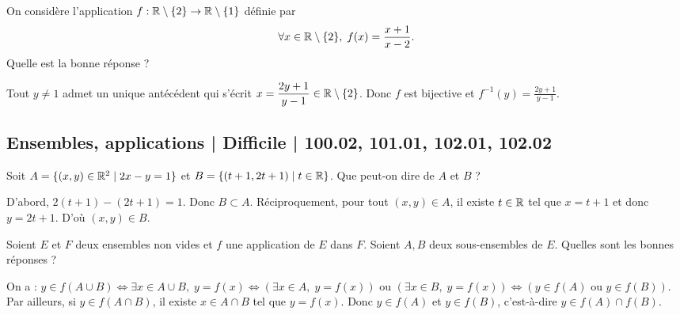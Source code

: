 \begin{question}
On considère l'application $f:\mathbb{R}\setminus\{2\}\to \mathbb{R}\setminus \{1\}$ définie par
$$\forall x\in \mathbb{R}\setminus\{2\},\; f(x)=\frac{x+1}{x-2}.$$
Quelle est la bonne réponse ?
\begin{answers}  
\end{answers}
\begin{explanations}
Tout $y\neq 1$ admet un unique antécédent qui s'écrit $\displaystyle x=\frac{2y+1}{y-1}\in \mathbb{R}\setminus\{2\}$. Donc $f$ est bijective et $\displaystyle f^{-1}(y)=\frac{2y+1}{y-1}$.
\end{explanations}
\end{question}

\subsection{Ensembles, applications | Difficile | 100.02, 101.01, 102.01, 102.02}


\begin{question}
Soit $A=\{(x,y)\in \mathbb{R}^2\mid 2x-y=1\}$ et $B=\{(t+1,2t+1)\mid t\in \mathbb{R}\}$. Que peut-on dire de $A$ et $B$ ?
\begin{answers}  
\end{answers}
\begin{explanations}
D'abord, $2(t+1)-(2t+1)=1$. Donc $B\subset A$. Réciproquement, pour tout $(x,y)\in A$, il existe $t\in \mathbb{R}$ tel que $x=t+1$ et donc $y=2t+1$. D'où $(x,y)\in B$.
\end{explanations}
\end{question}

\begin{question}
Soient $E$ et $F$ deux ensembles non vides et $f$ une application de $E$ dans $F$. Soient $A,B$ deux sous-ensembles de $E$. Quelles sont les bonnes réponses ?
\begin{answers}  
\end{answers}
\begin{explanations}
On a : $y\in f(A\cup B)\Leftrightarrow \exists x\in A\cup B,\; y=f(x)\Leftrightarrow (\exists x\in A,\; y=f(x))\mbox{ ou }(\exists x\in B,\; y=f(x))\Leftrightarrow (y\in f(A)\mbox{ ou }y\in f(B))$. Par ailleurs, si $y\in f(A\cap B)$, il existe $x\in A\cap B$ tel que $y=f(x)$. Donc $y\in f(A)$ et $y\in f(B)$, c'est-à-dire $y\in f(A)\cap f(B)$.
\end{explanations}
\end{question}


